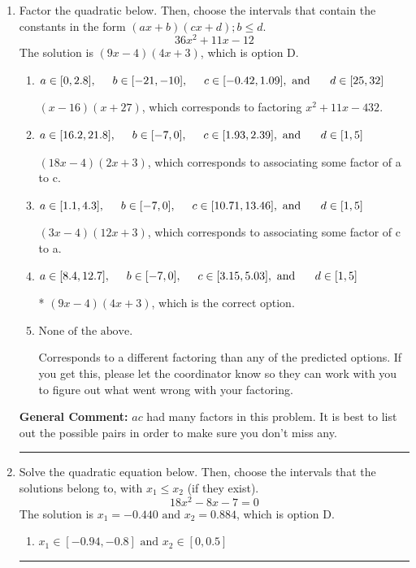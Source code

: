 \documentclass{extbook}[14pt]
\newcommand{\litem}[1]{\item #1

\rule{\textwidth}{0.4pt}}
\begin{document}
\begin{enumerate}\litem{
Factor the quadratic below. Then, choose the intervals that contain the constants in the form $(ax+b)(cx+d); b \leq d.$
\[ 36x^{2} +11 x -12 \]
The solution is \( (9x -4)(4x + 3) \), which is option D.\begin{enumerate}[label=\Alph*.]
\item \( a \in [0, 2.8], \hspace*{5mm} b \in [-21, -10], \hspace*{5mm} c \in [-0.42, 1.09], \text{ and } \hspace*{5mm} d \in [25, 32] \)

 $(x -16)(x + 27)$, which corresponds to factoring $x^{2} +11 x -432$.
\item \( a \in [16.2, 21.8], \hspace*{5mm} b \in [-7, 0], \hspace*{5mm} c \in [1.93, 2.39], \text{ and } \hspace*{5mm} d \in [1, 5] \)

 $(18x -4)(2x + 3)$, which corresponds to associating some factor of a to c.
\item \( a \in [1.1, 4.3], \hspace*{5mm} b \in [-7, 0], \hspace*{5mm} c \in [10.71, 13.46], \text{ and } \hspace*{5mm} d \in [1, 5] \)

 $(3x -4)(12x + 3)$, which corresponds to associating some factor of c to a.
\item \( a \in [8.4, 12.7], \hspace*{5mm} b \in [-7, 0], \hspace*{5mm} c \in [3.15, 5.03], \text{ and } \hspace*{5mm} d \in [1, 5] \)

* $(9x -4)(4x + 3)$, which is the correct option.
\item \( \text{None of the above.} \)

 Corresponds to a different factoring than any of the predicted options. If you get this, please let the coordinator know so they can work with you to figure out what went wrong with your factoring.
\end{enumerate}

\textbf{General Comment:} $ac$ had many factors in this problem. It is best to list out the possible pairs in order to make sure you don't miss any.
}
\litem{
Solve the quadratic equation below. Then, choose the intervals that the solutions belong to, with $x_1 \leq x_2$ (if they exist).
\[ 18x^{2} -8 x -7 = 0 \]
The solution is \( x_1 = -0.440 \text{ and } x_2 = 0.884 \), which is option D.\begin{enumerate}[label=\Alph*.]
\item \( x_1 \in [-0.94, -0.8] \text{ and } x_2 \in [0, 0.5] \)


\end{enumerate}}
\end{enumerate}
\end{document}
